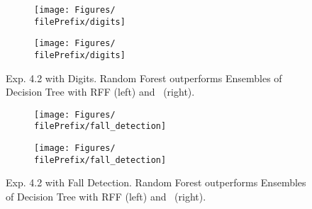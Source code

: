 \begin{figure}[H]
  \centering
  \renewcommand{\filePrefix}{\undPrefix/rff}
  \begin{subfigure}[t]{0.5\linewidth}
    \centering\captionsetup{width=.8\linewidth}\texttt{[image: Figures/\\filePrefix/digits]}
    \label{fig:\undPrefix_digits}
  \end{subfigure}%
  \renewcommand{\filePrefix}{\undPrefix/nys}%
  \begin{subfigure}[t]{0.5\linewidth}
    \centering\captionsetup{width=.8\linewidth}\texttt{[image: Figures/\\filePrefix/digits]}
    \label{fig:\undPrefix_digits}
  \end{subfigure}
  \caption*{Exp. 4.2 with Digits. Random Forest outperforms Ensembles of Decision Tree with RFF (left) and \Nys\ (right).}
\end{figure}


\begin{figure}[H]
  \centering
  \renewcommand{\filePrefix}{\undPrefix/rff}
  \begin{subfigure}[t]{0.5\linewidth}
    \centering\captionsetup{width=.8\linewidth}\texttt{[image: Figures/\\filePrefix/fall\_detection]}
    \label{fig:\undPrefix_fall_detection}
  \end{subfigure}%
  \renewcommand{\filePrefix}{\undPrefix/nys}%
  \begin{subfigure}[t]{0.5\linewidth}
    \centering\captionsetup{width=.8\linewidth}\texttt{[image: Figures/\\filePrefix/fall\_detection]}
    \label{fig:\undPrefix_fall_detection}
  \end{subfigure}%
  \caption*{Exp. 4.2 with Fall Detection. Random Forest outperforms Ensembles of Decision Tree with RFF (left) and \Nys\ (right).}
\end{figure}


